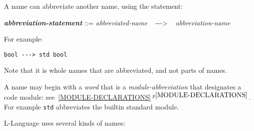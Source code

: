 \documentclass[12pt]{article}
\newcommand{\ABV}{-{}-{}->}
\newcommand{\emkey}[1]{{\em \bfseries #1}}
\newcommand{\itemref}[1]{\ref{#1}$\,^{p\pageref{#1}}$}
\newenvironment{indpar}[1][0.3in]%
	{\begin{list}{}%
		     {\setlength{\itemsep}{0in}%
		      \setlength{\topsep}{0in}%
		      \setlength{\parsep}{1ex}%
		      \setlength{\labelwidth}{#1}%
		      \setlength{\leftmargin}{#1}%
		      \addtolength{\leftmargin}{\labelsep}}%
	 \item}%
	{\end{list}}
\begin{document}
A name can abbreviate another name, using the statement:
\begin{indpar}
\emkey{abbreviation-statement} ::=
    {\em abbreviated-name} ~ \ABV{} ~ {\em abbreviation-name}
\end{indpar}
For example:
\begin{center}
\tt bool \ABV{} std bool
\end{center}

Note that it is whole names that are abbreviated, and not parts of
names.

A name may begin with a {\em word} that is a {\em module-abbreviation}
that designates a code module: see~\itemref{MODULE-DECLARATIONS}.
For example {\tt std} abbreviates the builtin standard module.

L-Language uses several kinds of names:
\end{document}
